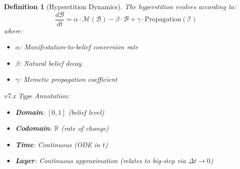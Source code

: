 \documentclass[11pt,twoside]{book}
\newtheorem{definition}{Definition}[chapter]
\begin{document}
\begin{definition}[Hyperstition Dynamics]
\label{def:hyper-dynamics}
The hyperstition evolves according to:
\[
    \frac{d\mathcal{B}}{dt} = \alpha \cdot \mathcal{M}(\mathcal{B}) - \beta \cdot \mathcal{B}
    + \gamma \cdot \mathrm{Propagation}(\mathcal{I})
\]
where:
\begin{itemize}
    \item $\alpha$: Manifestation-to-belief conversion rate
    \item $\beta$: Natural belief decay
    \item $\gamma$: Memetic propagation coefficient
\end{itemize}

\textit{v7.x Type Annotation:}
\begin{itemize}
    \item \textbf{Domain}: $[0,1]$ (belief level)
    \item \textbf{Codomain}: $\mathbb{R}$ (rate of change)
    \item \textbf{Time}: Continuous (ODE in $t$)
    \item \textbf{Layer}: Continuous approximation (relates to big-step via $\Delta t \to 0$)
\end{itemize}
\end{definition}
\end{document}
